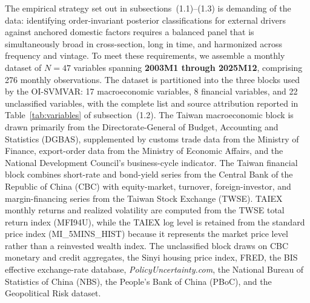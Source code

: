 The empirical strategy set out in subsections~(1.1)--(1.3) is demanding of the data: identifying order-invariant posterior classifications for external drivers against anchored domestic factors requires a balanced panel that is simultaneously broad in cross-section, long in time, and harmonized across frequency and vintage. To meet these requirements, we assemble a monthly dataset of $N = 47$ variables spanning \textbf{2003M1 through 2025M12}, comprising 276 monthly observations. The dataset is partitioned into the three blocks used by the OI-SVMVAR: 17 macroeconomic variables, 8 financial variables, and 22 unclassified variables, with the complete list and source attribution reported in Table~\ref{tab:variables} of subsection~(1.2). The Taiwan macroeconomic block is drawn primarily from the Directorate-General of Budget, Accounting and Statistics (DGBAS), supplemented by customs trade data from the Ministry of Finance, export-order data from the Ministry of Economic Affairs, and the National Development Council's business-cycle indicator. The Taiwan financial block combines short-rate and bond-yield series from the Central Bank of the Republic of China (CBC) with equity-market, turnover, foreign-investor, and margin-financing series from the Taiwan Stock Exchange (TWSE). TAIEX monthly returns and realized volatility are computed from the TWSE total return index (MFI94U), while the TAIEX log level is retained from the standard price index (MI\_5MINS\_HIST) because it represents the market price level rather than a reinvested wealth index. The unclassified block draws on CBC monetary and credit aggregates, the Sinyi housing price index, FRED, the BIS effective exchange-rate database, \textit{PolicyUncertainty.com}, the National Bureau of Statistics of China (NBS), the People's Bank of China (PBoC), and the \citet{caldara2022measuring} Geopolitical Risk dataset.

